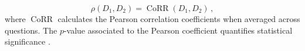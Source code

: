 $$
\rho\left(D_1, D_2\right) = \operatorname{CoRR}\left(D_{1},  D_{2}\right)\, ,
$$
where $\operatorname{CoRR}$ calculates the Pearson correlation coefficients when averaged across questions. The $p$-value associated to the Pearson coefficient quantifies statistical significance \cite{kowalski1972effects}.




